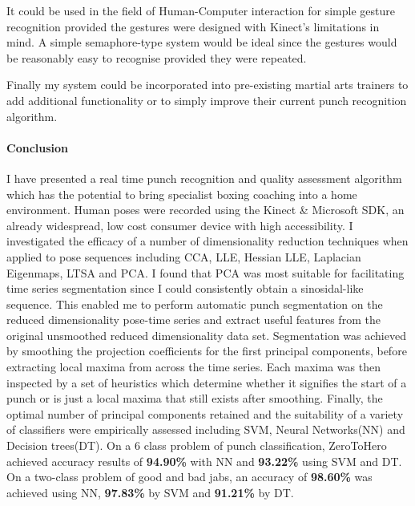 It could be used in the field of Human-Computer interaction for simple gesture recognition provided the gestures were designed with Kinect's limitations in mind. A simple semaphore-type system would be ideal since the gestures would be reasonably easy to recognise provided they were repeated.

Finally my system could be incorporated into pre-existing martial arts trainers to add additional functionality or to simply improve their current punch recognition algorithm.

\paragraph{Conclusion}
I have presented a real time punch recognition and quality assessment algorithm which has the potential to bring specialist boxing coaching into a home environment. Human poses were recorded using the Kinect \& Microsoft SDK, an already widespread, low cost consumer device with high accessibility. 
I investigated the efficacy of a number of dimensionality reduction techniques when applied to pose sequences including CCA, LLE, Hessian LLE, Laplacian Eigenmaps, LTSA and PCA. I found that PCA was most suitable for facilitating time series segmentation since I could consistently obtain a sinosidal-like sequence. This enabled me to perform automatic punch segmentation on the reduced dimensionality pose-time series and extract useful features from the original unsmoothed reduced dimensionality data set. Segmentation was achieved by smoothing the projection coefficients for the first principal components, before extracting local maxima from across the time series. Each maxima was then inspected by a set of heuristics which determine whether it signifies the start of a punch or is just a local maxima that still exists after smoothing.
Finally, the optimal number of principal components retained and the suitability of a variety of classifiers were empirically assessed including SVM, Neural Networks(NN) and Decision trees(DT). On a 6 class problem of punch classification, ZeroToHero achieved accuracy results of {\bf 94.90\%} with NN and {\bf 93.22\%} using SVM and DT. On a two-class problem of good and bad jabs, an accuracy of {\bf 98.60\%} was achieved using NN, {\bf 97.83\%} by SVM and {\bf 91.21\%} by DT.